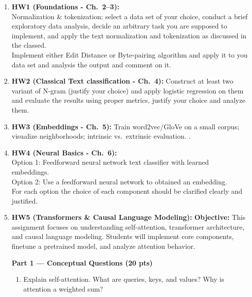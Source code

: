 \documentclass[12pt]{article}
\begin{document}
\begin{enumerate}[leftmargin=1.25em]
  \item \textbf{HW1 (Foundations - Ch.\ 2--3):} 
  \\ Normalization \& tokenization: 
  select a data set of your choice, conduct a brief exploratory data analysis, decide an arbitrary task you are supposed to implement, and apply the text normalization and tokenization as discussed in the classed. 
  \\ Implement either Edit Distance or Byte-pairing algorithm and apply it to you data set and analysis the output and comment on it. 
  \item \textbf{HW2 (Classical Text classification - Ch.\ 4):} Construct at least two variant of N-gram (justify your choice) and apply logistic regression on them and evaluate the results using proper metrics, justify your choice and analyze them.
  \item \textbf{HW3 (Embeddings - Ch.\ 5):} Train word2vec/GloVe on a small corpus; visualize neighborhoods; intrinsic vs.\ extrinsic evaluation. .
  \item \textbf{HW4 (Neural Basics - Ch.\ 6):} \\ Option 1: Feedforward neural network text classifier with learned embeddings.
  \\ Option 2: Use a feedforward neural network to obtained an embedding. 
  \\ For each option the choice of each component should be clarified clearly and justified. 


  \item \textbf{HW5 (Transformers \& Causal Language Modeling):} \newline
  \textbf{Objective:}
    This assignment focuses on understanding self-attention, transformer architecture, and causal language modeling. Students will implement core components, finetune a pretrained model, and analyze attention behavior.
    
    \vspace{0.5em}
    
    \textbf{Part 1 — Conceptual Questions (20 pts)}
    
    \begin{enumerate}
    \item Explain self-attention. What are queries, keys, and values? Why is attention a weighted sum?
    

\end{enumerate}
\end{enumerate}
\end{document}
